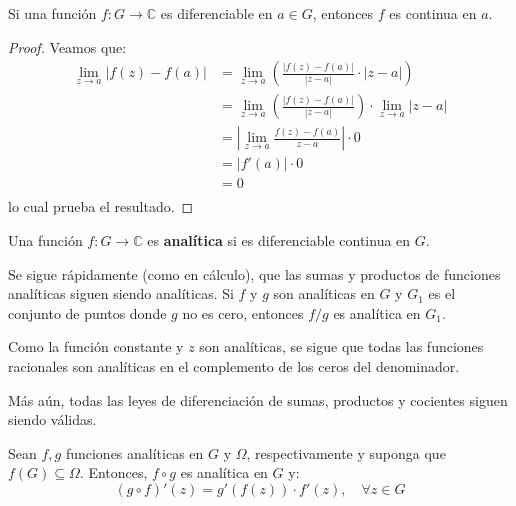 \documentclass[12pt]{report}
\theoremstyle{largebreak}
\newcommand\abs[1]{\ensuremath{\left|#1\right|}}
\newcommand\cf[3]{\ensuremath{#1:#2\rightarrow#3}}
\begin{document}
    \begin{propo}
        Si una función $\cf{f}{G}{\mathbb{C}}$ es diferenciable en $a\in G$, entonces $f$ es continua en $a$.
    \end{propo}

    \begin{proof}
        Veamos que:
        \begin{equation*}
            \begin{split}
                \lim_{ z\rightarrow a}\abs{f(z)-f(a)}&=\lim_{ z\rightarrow a}\left(\frac{\abs{f(z)-f(a)}}{\abs{z-a}}\cdot\abs{z-a}\right)\\
                &=\lim_{ z\rightarrow a}\left(\frac{\abs{f(z)-f(a)}}{\abs{z-a}}\right)\cdot\lim_{ z\rightarrow a}\abs{z-a}\\
                &=\abs{\lim_{ z\rightarrow a}\frac{f(z)-f(a)}{z-a}}\cdot 0\\
                &=\abs{f'(a)}\cdot 0\\
                &=0\\
            \end{split}
        \end{equation*}
        lo cual prueba el resultado.
    \end{proof}

    \begin{mydef}
        Una función $\cf{f}{G}{\mathbb{C}}$ es \textbf{analítica} si es diferenciable continua en $G$.
    \end{mydef}

    Se sigue rápidamente (como en cálculo), que las sumas y productos de funciones analíticas siguen siendo analíticas. Si $f$ y $g$ son analíticas en $G$ y $G_1$ es el conjunto de puntos donde $g$ no es cero, entonces $f/g$ es analítica en $G_1$.

    Como la función constante y $z$ son analíticas, se sigue que todas las funciones racionales son analíticas en el complemento de los ceros del denominador.

    Más aún, todas las leyes de diferenciación de sumas, productos y cocientes siguen siendo válidas.

    \begin{theor}
        Sean $f,g$ funciones analíticas en $G$ y $\Omega$, respectivamente y suponga que $f(G)\subseteq\Omega$. Entonces, $f\circ g$ es analítica en $G$ y:
        \begin{equation*}
            (g\circ f)'(z)=g'(f(z))\cdot f'(z),\quad\forall z\in G
        \end{equation*}
    \end{theor}
\end{document}
